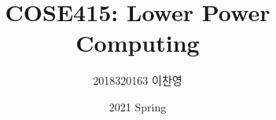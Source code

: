 

\title{COSE415: Lower Power Computing}
\author{2018320163 이찬영}
\date{2021 Spring}


    \maketitle
    \tableofcontents
    \setimgdir

